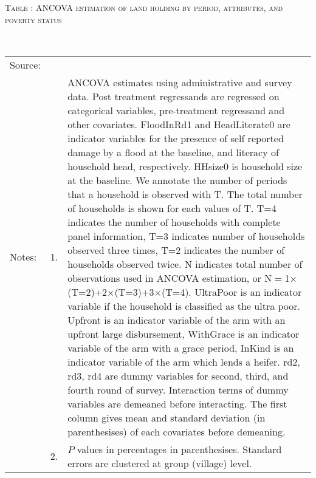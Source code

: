 \hspace{-1cm}\begin{minipage}[t]{14cm}
\hfil\textsc{\normalsize Table \thetable: ANCOVA estimation of land holding by period, attributes, and poverty status\label{tab ANCOVA land period poverty attributes}}\\
\setlength{\tabcolsep}{1pt}
\setlength{\baselineskip}{8pt}
\renewcommand{\arraystretch}{.55}
\hfil{}\\
\renewcommand{\arraystretch}{.8}
\setlength{\tabcolsep}{1pt}
\begin{tabular}{>{\hfill\scriptsize}p{1cm}<{}>{\hfill\scriptsize}p{.25cm}<{}>{\scriptsize}p{12cm}<{\hfill}}
Source:& \multicolumn{2}{l}{\scriptsize Estimated with GUK administrative and survey data.}\\
Notes: & 1. & ANCOVA estimates using administrative and survey data. Post treatment regressands are regressed on categorical variables, pre-treatment regressand and other covariates. \textsf{FloodInRd1} and \textsf{HeadLiterate0} are indicator variables for the presence of self reported damage by a flood at the baseline, and literacy of household head, respectively. \textsf{HHsize0} is household size at the baseline. We annotate the number of periods that a household is observed with \textsf{T}. The total number of households is shown for each values of \textsf{T}. \textsf{T=4} indicates the number of households with complete panel information, \textsf{T=3} indicates number of households observed three times, \textsf{T=2} indicates the number of households observed twice. \textsf{N} indicates total number of observations used in ANCOVA estimation, or \textsf{N$=$1$\times$(T=2)+2$\times$(T=3)+3$\times$(T=4)}.  \textsf{UltraPoor} is an indicator variable if the household is classified as the ultra poor. \textsf{Upfront} is an indicator variable of the arm with an upfront large disbursement, \textsf{WithGrace} is an indicator variable of the arm with a grace period, \textsf{InKind} is an indicator variable of the arm which lends a heifer. \textsf{rd2, rd3, rd4} are dummy variables for second, third, and fourth round of survey. Interaction terms of dummy variables are demeaned before interacting. The first column gives mean and standard deviation (in parenthesises) of each covariates before demeaning.\\
& 2. & $P$ values in percentages in parenthesises. Standard errors are clustered at group (village) level.
\end{tabular}
\end{minipage}

